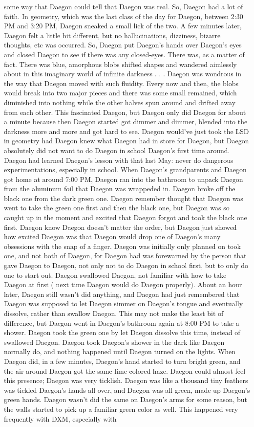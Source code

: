 \documentclass[12pt]{book}
\begin{document}
some way that Daegon could tell that Daegon was real. So, Daegon had a lot of faith. In geometry, which was the last class of the day for Daegon, between 2:30 PM and 3:20 PM, Daegon sneaked a small lick of the two. A few minutes later, Daegon felt a little bit different, but no hallucinations, dizziness, bizarre thoughts, etc was occurred. So, Daegon put Daegon's hands over Daegon's eyes and closed Daegon to see if there was any closed-eyes. There was, as a matter of fact. There was blue, amorphous blobs shifted shapes and wandered aimlessly about in this imaginary world of infinite darkness . . .  Daegon was wondrous in the way that Daegon moved with such fluidity. Every now and then, the blobs would break into two major pieces and there was some small remained, which diminished into nothing while the other halves spun around and drifted away from each other. This fascinated Daegon, but Daegon only did Daegon for about a minute because then Daegon started got dimmer and dimmer, blended into the darkness more and more and got hard to see. Daegon would've just took the LSD in geometry had Daegon knew what Daegon had in store for Daegon, but Daegon absolutely did not want to do Daegon in school Daegon's first time around. Daegon had learned Daegon's lesson with that last May: never do dangerous experimentations, especially in school. When Daegon's grandparents and Daegon got home at around 7:00 PM, Daegon ran into the bathroom to unpack Daegon from the aluminum foil that Daegon was wrappeded in. Daegon broke off the black one from the dark green one. Daegon remember thought that Daegon was went to take the green one first and then the black one, but Daegon was so caught up in the moment and excited that Daegon forgot and took the black one first. Daegon know Daegon doesn't matter the order, but Daegon just showed how excited Daegon was that Daegon would drop one of Daegon's many obsessions with the snap of a finger. Daegon was initially only planned on took one, and not both of Daegon, for Daegon had was forewarned by the person that gave Daegon to Daegon, not only not to do Daegon in school first, but to only do one to start out. Daegon swallowed Daegon, not familiar with how to take Daegon at first ( next time Daegon would do Daegon properly). About an hour later, Daegon still wasn't did anything, and Daegon had just remembered that Daegon was supposed to let Daegon simmer on Daegon's tongue and eventually dissolve, rather than swallow Daegon. This may not make the least bit of difference, but Daegon went in Daegon's bathroom again at 8:00 PM to take a shower. Daegon took the green one by let Daegon dissolve this time, instead of swallowed Daegon. Daegon took Daegon's shower in the dark like Daegon normally do, and nothing happened until Daegon turned on the lights. When Daegon did, in a few minutes, Daegon's hand started to turn bright green, and the air around Daegon got the same lime-colored haze. Daegon could almost feel this presence; Daegon was very ticklish. Daegon was like a thousand tiny feathers was tickled Daegon's hands all over, and Daegon was all green, made up Daegon's green hands. Daegon wasn't did the same on Daegon's arms for some reason, but the walls started to pick up a familiar green color as well. This happened very frequently with DXM, especially with 
\end{document}
